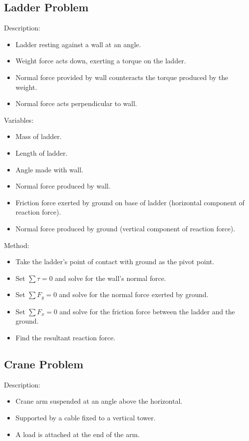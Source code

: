 \documentclass[a4paper,11pt]{report}
\begin{document}
\subsection{Ladder Problem}

Description:

\begin{itemize}
\item Ladder resting against a wall at an angle.
\item Weight force acts down, exerting a torque on the ladder.
\item Normal force provided by wall counteracts the torque produced by the
	weight.
\item Normal force acts perpendicular to wall.
\end{itemize}

Variables:

\begin{itemize}
\item Mass of ladder.
\item Length of ladder.
\item Angle made with wall.
\item Normal force produced by wall.
\item Friction force exerted by ground on base of ladder (horizontal component
	of reaction force).
\item Normal force produced by ground (vertical component of reaction force).
\end{itemize}

Method:

\begin{itemize}
\item Take the ladder's point of contact with ground as the pivot point.
\item Set $\sum \tau = 0$ and solve for the wall's normal force.
\item Set $\sum F_y = 0$ and solve for the normal force exerted by ground.
\item Set $\sum F_x = 0$ and solve for the friction force between the ladder
	and the ground.
\item Find the resultant reaction force.
\end{itemize}

\subsection{Crane Problem}

Description:

\begin{itemize}
\item Crane arm suspended at an angle above the horizontal.
\item Supported by a cable fixed to a vertical tower.
\item A load is attached at the end of the arm.
\end{itemize}
\end{document}
